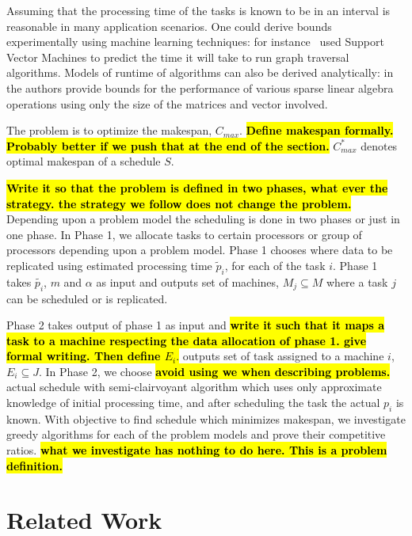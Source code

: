 \documentclass[10pt, conference, compsocconf]{IEEEtran}
\newcommand{\todo}[1]{{\color{red}\textbf{\hl{#1}}\xspace}}
\begin{document}
Assuming that the processing time of the tasks is known to be in an
interval is reasonable in many application scenarios. One could derive
bounds experimentally using machine learning techniques: for
instance~\cite{You14-ICPP} used Support Vector Machines to predict the time it
will take to run graph traversal algorithms. Models of runtime of
algorithms can also be derived analytically:
in~\cite{Erlebacher14-ICS} the authors provide bounds for the
performance of various sparse linear algebra operations using only the
size of the matrices and vector involved.

The problem is to optimize the makespan, $C_{max}$. \todo{Define
  makespan formally. Probably better if we push that at the end of the
  section.} $C_{max}^{*}$ denotes optimal makespan of a schedule $S$.

\todo{Write it so that the problem is defined in two phases, what ever
  the strategy. the strategy we follow does not change the problem.}
Depending upon a problem model the scheduling is done in two phases or
just in one phase. In Phase 1, we allocate tasks to certain processors
or group of processors depending upon a problem model.  Phase 1
chooses where data to be replicated using estimated processing time
$\tilde p_i $, for each of the task $i$. Phase 1 takes $\tilde{p_i}$,
$m$ and $\alpha$ as input and outputs set of machines, $M_j \subseteq
M $ where a task $j$ can be scheduled or is replicated.

Phase 2 takes output of phase 1 as input and \todo{write it such that
  it maps a task to a machine respecting the data allocation of phase
  1. give formal writing. Then define $E_i.$} outputs set of task
assigned to a machine $i$, $E_i \subseteq J$.  In Phase 2, we choose
\todo{avoid using we when describing problems.} actual schedule with
semi-clairvoyant algorithm which uses only approximate knowledge of
initial processing time, and after scheduling the task the actual
$p_i$ is known.  With objective to find schedule which minimizes
makespan, we investigate greedy algorithms for each of the problem
models and prove their competitive ratios. \todo{what we investigate
  has nothing to do here. This is a problem definition.}


\section{Related Work}\label{sec3}
\end{document}
